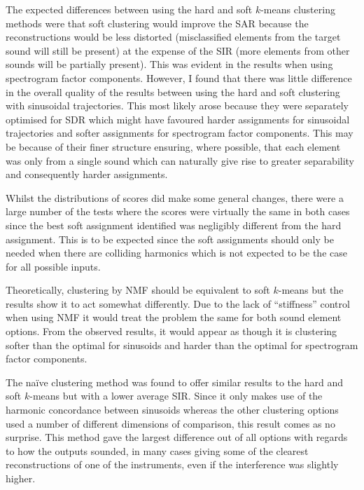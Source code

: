\documentclass[12pt,a4paper,twoside,openright]{report}
\begin{document}

The expected differences between using the hard and soft $ k $-means clustering methods were that soft clustering would improve the SAR because the reconstructions would be less distorted (misclassified elements from the target sound will still be present) at the expense of the SIR (more elements from other sounds will be partially present). This was evident in the results when using spectrogram factor components. However, I found that there was little difference in the overall quality of the results between using the hard and soft clustering with sinusoidal trajectories. This most likely arose because they were separately optimised for SDR which might have favoured harder assignments for sinusoidal trajectories and softer assignments for spectrogram factor components. This may be because of their finer structure ensuring, where possible, that each element was only from a single sound which can naturally give rise to greater separability and consequently harder assignments.

Whilst the distributions of scores did make some general changes, there were a large number of the tests where the scores were virtually the same in both cases since the best soft assignment identified was negligibly different from the hard assignment. This is to be expected since the soft assignments should only be needed when there are colliding harmonics which is not expected to be the case for all possible inputs.


Theoretically, clustering by NMF should be equivalent to soft $ k $-means but the results show it to act somewhat differently. Due to the lack of ``stiffness'' control when using NMF it would treat the problem the same for both sound element options. From the observed results, it would appear as though it is clustering softer than the optimal for sinusoids and harder than the optimal for spectrogram factor components.

The na\"{i}ve clustering method was found to offer similar results to the hard and soft $ k $-means but with a lower average SIR. Since it only makes use of the harmonic concordance between sinusoids whereas the other clustering options used a number of different dimensions of comparison, this result comes as no surprise. {\color{red}This method gave the largest difference out of all options with regards to how the outputs sounded, in many cases giving some of the clearest reconstructions of one of the instruments, even if the interference was slightly higher.}
\end{document}
